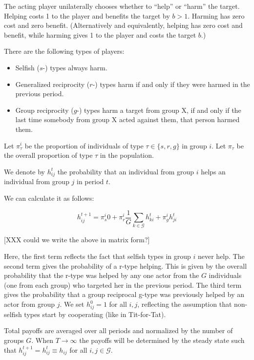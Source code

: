 \documentclass[
]{article}
\providecommand{\tightlist}{%
  \setlength{\itemsep}{0pt}\setlength{\parskip}{0pt}}
\begin{document}
The acting player unilaterally chooses whether to ``help'' or ``harm''
the target. Helping costs 1 to the player and benefits the target by
\(b > 1\). Harming has zero cost and zero benefit. (Alternatively and
equivalently, helping has zero cost and benefit, while harming gives 1
to the player and costs the target \(b\).)

There are the following types of players:

\begin{itemize}
\tightlist
\item
  Selfish (\(s\)-) types always harm.
\item
  Generalized reciprocity (\(r\)-) types harm if and only if they were
  harmed in the previous period.
\item
  Group reciprocity (\(g\)-) types harm a target from group X, if and
  only if the last time somebody from group X acted against them, that
  person harmed them.
\end{itemize}

Let \(\pi^i_\tau\) be the proportion of individuals of type
\(\tau \in \{s, r, g\}\) in group \(i\). Let \(\pi_\tau\) be the overall
proportion of type \(\tau\) in the population.

We denote by \(h^t_{ij}\) the probability that an individual from group
\(i\) helps an individual from group \(j\) in period \(t\).

We can calculate it as follows:

\begin{equation}
h^{t+1}_{ij} = \pi^i_s0  
      + \pi^i_r \frac{1}{G}\sum_{k \in \mathcal{G}} h^t_{ki} 
      + \pi^i_g h^t_{ji}
\label{eq:help-ij}
\end{equation}

{[}XXX could we write the above in matrix form?{]}

Here, the first term reflects the fact that selfish types in group \(i\)
never help. The second term gives the probability of a r-type helping.
This is given by the overall probability that the r-type was helped by
any one actor from the \(G\) individuals (one from each group) who
targeted her in the previous period. The third term gives the
probability that a group reciprocal g-type was previously helped by an
actor from group \(j\). We set \(h^0_{ij} = 1\) for all \(i,j\),
reflecting the assumption that non-selfish types start by cooperating
(like in Tit-for-Tat).

Total payoffs are averaged over all periods and normalized by the number
of groups \(G\). When \(T \rightarrow \infty\) the payoffs will be
determined by the steady state such that
\(h^{t+1}_{ij} = h^{t}_{ij} \equiv h_{ij}\) for all
\(i,j\in \mathcal{G}\).
\end{document}
